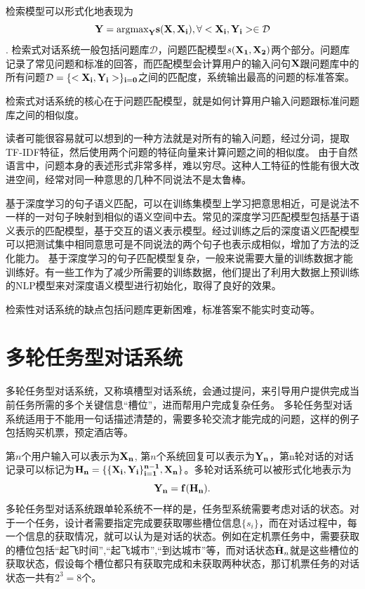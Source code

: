 检索模型可以形式化地表现为
$$\bf{Y} = \text{argmax}_{\bf{Y}} s(\bf{X},\bf{X}_i), \forall <\bf{X}_i,\bf{Y}_i> \in \mathcal{D}$$.
检索式对话系统一般包括问题库$\mathcal{D}$，问题匹配模型$s(\bf{X}_1,\bf{X}_2)$两个部分。问题库记录了常见问题和标准的回答，而匹配模型会计算用户的输入问句$\bf{X}$跟问题库中的所有问题$\mathcal{D}=\{<\bf{X}_i,\bf{Y}_i>\}_{i=0}$之间的匹配度，系统输出最高的问题的标准答案。

检索式对话系统的核心在于问题匹配模型，就是如何计算用户输入问题跟标准问题库之间的相似度。

读者可能很容易就可以想到的一种方法就是对所有的输入问题，经过分词，提取TF-IDF特征，然后使用两个问题的特征向量来计算问题之间的相似度。
由于自然语言中，问题本身的表述形式非常多样，难以穷尽。这种人工特征的性能有很大改进空间，经常对同一种意思的几种不同说法不是太鲁棒。

基于深度学习的句子语义匹配，可以在训练集模型上学习把意思相近，可是说法不一样的一对句子映射到相似的语义空间中去。常见的深度学习匹配模型包括基于语义表示的匹配模型，基于交互的语义表示模型。经过训练之后的深度语义匹配模型可以把测试集中相同意思可是不同说法的两个句子也表示成相似，增加了方法的泛化能力。
基于深度学习的句子匹配模型复杂，一般来说需要大量的训练数据才能训练好。有一些工作为了减少所需要的训练数据，他们提出了利用大数据上预训练的NLP模型来对深度语义模型进行初始化，取得了良好的效果。

检索性对话系统的缺点包括问题库更新困难，标准答案不能实时变动等。

\section{多轮任务型对话系统}
多轮任务型对话系统\cite{young2013pomdp}，又称填槽型对话系统，会通过提问，来引导用户提供完成当前任务所需的多个关键信息``槽位''，进而帮用户完成复杂任务。
多轮任务型对话系统适用于不能用一句话描述清楚的，需要多轮交流才能完成的问题，这样的例子包括购买机票，预定酒店等。

第$n$个用户输入可以表示为$\bf{X}_n$, 第$n$个系统回复可以表示为$\bf{Y}_n$，第n轮对话的对话记录可以标记为$\bf{H}_n=\{ \{\bf{X}_i,\bf{Y}_i\}_{i=1}^{n-1}, \bf{X}_n\}$。多轮对话系统可以被形式化地表示为
$$\bf{Y}_n = f(\bf{H}_n).$$
多轮任务型对话系统跟单轮系统不一样的是，任务型系统需要考虑对话的状态。对于一个任务，设计者需要指定完成要获取哪些槽位信息$\{s_i\}$，而在对话过程中，每一个信息的获取情况，就可以认为是对话的状态。例如在定机票任务中，需要获取的槽位包括``起飞时间'',``起飞城市'',``到达城市''等，而对话状态$\tilde{\bf{H}}_n$就是这些槽位的获取状态，假设每个槽位都只有获取完成和未获取两种状态，那订机票任务的对话状态一共有$2^3=8$个。

